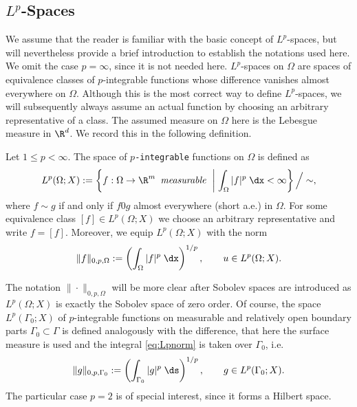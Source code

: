 \subsection{\texorpdfstring{$L^p$}{Lp}-Spaces}\label{sec:Lpspaces}
We assume that the reader is familiar with the basic concept of $L^p$-spaces, but will nevertheless provide a brief introduction to establish the notations used here. We omit the case $p=\infty$, since it is not needed here. $L^p$-spaces on $\Omega$ are spaces of equivalence classes of $p$-integrable functions whose difference vanishes almost everywhere on $\Omega$. Although this is the most correct way to define $L^p$-spaces, we will subsequently always assume an actual function by choosing an arbitrary representative of a class. The assumed measure on $\Omega$ here is the Lebesgue measure in $\R^d$. We record this in the following definition.

\begin{definition}[$L^p$-Spaces]\label{def:Lpspaces}
	Let $1\le p<\infty$. The space of {\tt $p$-integrable} functions on $\Omega$ is defined as
	\begin{equation*}
		L^p(\Omega;X):= \left\{ f:\Omega\to\R^m\text{\em\enspace measurable }\;\middle|\;\int_\Omega|f|^p\;\dx<\infty\right\}\Big/\sim,
	\end{equation*}
	where $f\sim g$ if and only if $f 0 g$ almost everywhere (short a.e.) in $\Omega$. For some equivalence class $[f]\in L^p(\Omega;X)$ we choose an arbitrary representative and write $f = [f]$. Moreover, we equip $L^p(\Omega;X)$ with the norm
	\begin{equation}\label{eq:Lpnorm}
		\|f\|_{0,p,\Omega} := \left(\int_\Omega |f|^p\;\dx\right)^{1/p},\qquad u\in L^p(\Omega;X).
	\end{equation}
\end{definition}

The notation $\|\cdot\|_{0,p,\Omega}$ will be more clear after Sobolev spaces are introduced as $L^p(\Omega;X)$ is exactly the Sobolev space of zero order. Of course, the space $L^p(\Gamma_0;X)$ of $p$-integrable functions on measurable and relatively open boundary parts $\Gamma_0\subset\Gamma$ is defined analogously with the difference, that here the surface measure is used and the integral \eqref{eq:Lpnorm} is taken over $\Gamma_0$, i.e.
\begin{equation*}
	\|g\|_{0,p,\Gamma_0}:= \left(\int_{\Gamma_0}|g|^p\;\ds\right)^{1/p},\qquad g\in L^p(\Gamma_0;X).
\end{equation*}
The particular case $p=2$ is of special interest, since it forms a Hilbert space.

